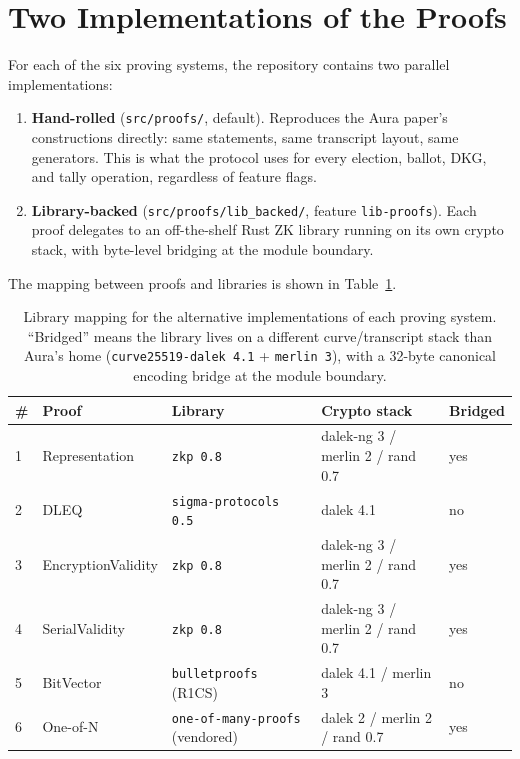 \documentclass[12pt,a4paper,oneside]{report}
\begin{document}
\section{Two Implementations of the Proofs}
\label{sec:impl-two-paths}

For each of the six proving systems, the repository contains two 
parallel implementations:

\begin{enumerate}
    \item \textbf{Hand-rolled} (\texttt{src/proofs/}, default). Reproduces 
    the Aura paper's constructions directly: same statements, same 
    transcript layout, same generators. This is what the protocol uses 
    for every election, ballot, DKG, and tally operation, regardless of 
    feature flags.
    \item \textbf{Library-backed} (\texttt{src/proofs/lib\_backed/}, 
    feature \texttt{lib-proofs}). Each proof delegates to an off-the-shelf 
    Rust ZK library running on its own crypto stack, with byte-level 
    bridging at the module boundary.
\end{enumerate}

The mapping between proofs and libraries is shown in 
Table~\ref{tab:impl-lib-mapping}.

\begin{table}[H]
\centering
\caption{Library mapping for the alternative implementations of each 
proving system. ``Bridged'' means the library lives on a different 
curve/transcript stack than Aura's home (\texttt{curve25519-dalek 4.1} 
+ \texttt{merlin 3}), with a 32-byte canonical encoding bridge at the 
module boundary.}
\label{tab:impl-lib-mapping}
\small
\begin{tabular}{p{0.4cm}p{3.0cm}p{3.5cm}p{4.5cm}p{1cm}}
\toprule
\# & Proof & Library & Crypto stack & Bridged \\
\midrule
1 & Representation & \texttt{zkp 0.8} & dalek-ng 3 / merlin 2 / rand 0.7 & yes \\
2 & DLEQ & \texttt{sigma-protocols 0.5} & dalek 4.1 & no \\
3 & EncryptionValidity & \texttt{zkp 0.8} & dalek-ng 3 / merlin 2 / rand 0.7 & yes \\
4 & SerialValidity & \texttt{zkp 0.8} & dalek-ng 3 / merlin 2 / rand 0.7 & yes \\
5 & BitVector & \texttt{bulletproofs} (R1CS) & dalek 4.1 / merlin 3 & no \\
6 & One-of-N & \texttt{one-of-many-proofs} (vendored) & dalek 2 / merlin 2 / rand 0.7 & yes \\
\bottomrule
\end{tabular}
\end{table}
\end{document}
